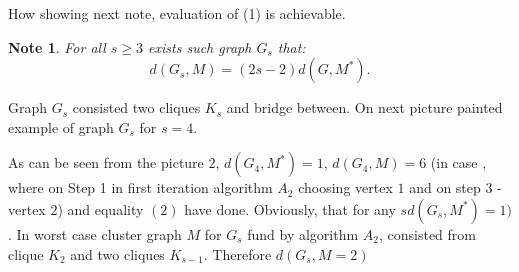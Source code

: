 \documentclass[12pt]{article}
\newtheorem{observation}{\hspace{1cm}Note}
\begin{document}
How showing next note, evaluation of (1) is achievable.

\begin{observation}
	For all $s\geq 3$ exists such graph $G_s$ that:
	$$
		d(G_s,M) = (2s-2)d(G,M^*).
	$$
\end{observation}
Graph $G_s$ consisted two cliques $K_s$ and bridge between. On next picture painted example of graph $G_s$ for $s=4$.

As can be seen from the picture $2$, $d(G_4, M^*) = 1$, $d(G_4, M) = 6$ (in case , where on Step 1 in first iteration algorithm $A_2$ choosing vertex $1$ and on step $3$ - vertex $2$) and equality $(2)$ have done.
Obviously, that for any $s d(G_s,M^*) = 1)$. In worst case cluster graph $M$ for $G_s$ fund by algorithm $A_2$, consisted from clique $K_2$ and two cliques $K_{s-1}$. Therefore $d(G_s,M = 2)$
\end{document}
